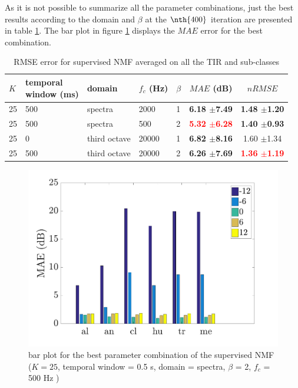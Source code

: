 \documentclass[twocolumn,a4paper,10pt]{article}
\begin{document}
As it is not possible to summarize all the parameter combinations, just the best results according to the domain and $\beta$ at the $\nth{400}$ iteration are presented in table \ref{tab:results_supervised}. The bar plot in figure \ref{fig:nmfSupervisedAmbiance} displays the $MAE$ error for the best combination.\\

\begin{table}[t]
\centering
\begin{tabular}{lllllcc}
$K$ & \shortstack{temporal\\window (ms)} & domain & $f_c$ (Hz) & $\beta$ & $MAE$ (dB) & $nRMSE$ \\
\hline
 25 & 500 & spectra &  2000 & 1 & \textbf{6.18 $\pm$7.49} & \textbf{1.48 $\pm$1.20} \\
 25 & 500 & spectra &   500 & 2 & \textbf{\textcolor{red}{5.32 $\pm$6.28}} & \textbf{1.40 $\pm$0.93} \\
 25 & 0 & third octave & 20000 & 1 & \textbf{6.82 $\pm$8.16} & 1.60 $\pm$1.34\\
 25 & 500 & third octave & 20000 & 2 & \textbf{6.26 $\pm$7.69} & \textbf{\textcolor{red}{1.36 $\pm$1.19}} \\
\end{tabular}
\caption{RMSE error for supervised NMF averaged on all the TIR and sub-classes}
\label{tab:results_supervised}
\end{table}

\begin{figure}[h]
\centering
\includegraphics[width=\linewidth]{../image/AmbianceNmfSupervised.pdf}
\caption{bar plot for the best parameter combination of the supervised NMF ($K = 25$, temporal window = 0.5 s, domain = spectra, $\beta$ = 2, $f_c$ = 500 Hz )}
\label{fig:nmfSupervisedAmbiance}
\end{figure}
\end{document}
